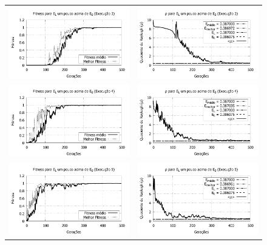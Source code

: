 \begin{figure}[htbp]
\begin{tabular}{@{}cc@{}}
		\includegraphics[width=.49\textwidth]{figs/resultados/variandoEL/T1E3_fitness.pdf} &
    \includegraphics[width=.49\textwidth]{figs/resultados/variandoEL/T1E3_rho.pdf}   \\
		
		\includegraphics[width=.49\textwidth]{figs/resultados/variandoEL/T1E4_fitness.pdf} &
    \includegraphics[width=.49\textwidth]{figs/resultados/variandoEL/T1E4_rho.pdf}   \\
		
		\includegraphics[width=.49\textwidth]{figs/resultados/variandoEL/T1E5_fitness.pdf} &
    \includegraphics[width=.49\textwidth]{figs/resultados/variandoEL/T1E5_rho.pdf}
		

\end{tabular}
\end{figure}
